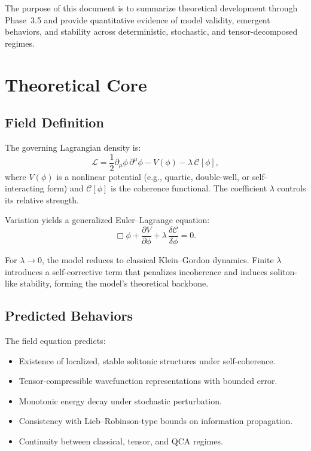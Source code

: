 \documentclass[11pt]{article}
\begin{document}
The purpose of this document is to summarize theoretical development through Phase~3.5 and provide quantitative evidence of model validity, emergent behaviors, and stability across deterministic, stochastic, and tensor-decomposed regimes.

\section{Theoretical Core}

\subsection{Field Definition}

The governing Lagrangian density is:
\begin{equation}
\mathcal{L} = \frac{1}{2} \partial_\mu \phi \, \partial^\mu \phi - V(\phi) - \lambda \, \mathcal{C}[\phi],
\end{equation}
where $V(\phi)$ is a nonlinear potential (e.g., quartic, double-well, or self-interacting form) and $\mathcal{C}[\phi]$ is the coherence functional. The coefficient $\lambda$ controls its relative strength.

Variation yields a generalized Euler–Lagrange equation:
\begin{equation}
\Box \phi + \frac{\partial V}{\partial \phi} + \lambda \, \frac{\delta \mathcal{C}}{\delta \phi} = 0.
\end{equation}

For $\lambda \rightarrow 0$, the model reduces to classical Klein–Gordon dynamics. Finite $\lambda$ introduces a self-corrective term that penalizes incoherence and induces soliton-like stability, forming the model’s theoretical backbone.

\subsection{Predicted Behaviors}

The field equation predicts:
\begin{itemize}
  \item Existence of localized, stable solitonic structures under self-coherence.
  \item Tensor-compressible wavefunction representations with bounded error.
  \item Monotonic energy decay under stochastic perturbation.
  \item Consistency with Lieb–Robinson-type bounds on information propagation.
  \item Continuity between classical, tensor, and QCA regimes.
\end{itemize}
\end{document}
